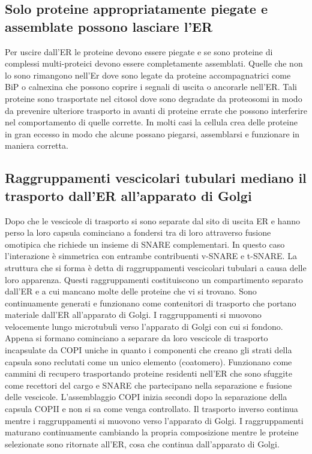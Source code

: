 \subsection{Solo proteine appropriatamente piegate e assemblate possono lasciare l'ER}
Per uscire dall'ER le proteine devono essere piegate e se sono proteine di complessi multi-proteici devono essere completamente assemblati. Quelle che non lo sono rimangono nell'Er dove
sono legate da proteine accompagnatrici come BiP o calnexina che possono coprire i segnali di uscita o ancorarle nell'ER. Tali proteine sono trasportate nel citosol dove sono degradate
da proteosomi in modo da prevenire ulteriore trasporto in avanti di proteine errate che possono interferire nel comportamento di quelle corrette. In molti casi la cellula crea delle
proteine in gran eccesso in modo che alcune possano piegarsi, assemblarsi e funzionare in maniera corretta. 
\subsection{Raggruppamenti vescicolari tubulari mediano il trasporto dall'ER all'apparato di Golgi}
Dopo che le vescicole di trasporto si sono separate dal sito di uscita ER e hanno perso la loro capsula cominciano a fondersi tra di loro attraverso fusione omotipica che richiede un
insieme di SNARE complementari. In questo caso l'interazione \`e simmetrica con entrambe contribuenti v-SNARE e t-SNARE. La struttura che si forma \`e detta di raggruppamenti vescicolari
tubulari a causa delle loro apparenza. Questi raggruppamenti costituiscono un compartimento separato dall'ER e a cui mancano molte delle proteine che vi si trovano. Sono continuamente
generati e funzionano come contenitori di trasporto che portano materiale dall'ER all'apparato di Golgi. I raggruppamenti si muovono velocemente lungo microtubuli verso l'apparato di 
Golgi con cui si fondono. Appena si formano cominciano a separare da loro vescicole di trasporto  incapsulate da COPI uniche in quanto i componenti che creano gli strati della
capsula sono reclutati come un unico elemento (coatomero). Funzionano come cammini di recupero trasportando proteine residenti nell'ER che sono sfuggite come recettori del 
cargo e SNARE che partecipano nella separazione e fusione delle vescicole. L'assemblaggio COPI inizia secondi dopo la separazione della capsula COPII e non si sa come venga controllato.
Il trasporto inverso continua mentre i raggruppamenti si muovono verso l'apparato di Golgi. I raggruppamenti maturano continuamente cambiando la propria composizione mentre le proteine
selezionate sono ritornate all'ER, cosa che continua dall'apparato di Golgi. 
